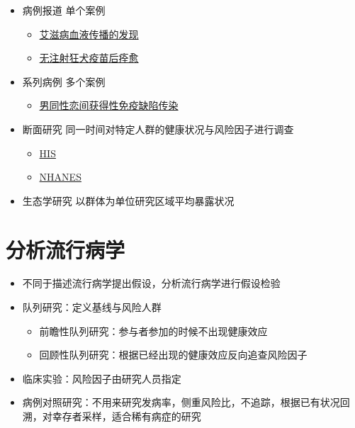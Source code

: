 \documentclass[]{book}
\providecommand{\tightlist}{%
  \setlength{\itemsep}{0pt}\setlength{\parskip}{0pt}}
\begin{document}
\begin{itemize}
\tightlist
\item
  病例报道 单个案例

  \begin{itemize}
  \tightlist
  \item
    \href{http://www.thelancet.com/journals/lancet/article/PIIS0140-6736(83)92082-2/abstract\#}{艾滋病血液传播的发现}
  \item
    \href{http://www.nejm.org/doi/full/10.1056/NEJMoa050382\#t=abstract}{无注射狂犬疫苗后痊愈}
  \end{itemize}
\item
  系列病例 多个案例

  \begin{itemize}
  \tightlist
  \item
    \href{http://www.nejm.org/doi/pdf/10.1056/NEJM198112103052401}{男同性恋间获得性免疫缺陷传染}
  \end{itemize}
\item
  断面研究 同一时间对特定人群的健康状况与风险因子进行调查

  \begin{itemize}
  \tightlist
  \item
    \href{http://www.cdc.gov/nchs/nhis.htm}{HIS}
  \item
    \href{http://www.cdc.gov/nchs/nhanes.htm}{NHANES}
  \end{itemize}
\item
  生态学研究 以群体为单位研究区域平均暴露状况
\end{itemize}

\hypertarget{ux5206ux6790ux6d41ux884cux75c5ux5b66}{%
\section{分析流行病学}\label{ux5206ux6790ux6d41ux884cux75c5ux5b66}}

\begin{itemize}
\tightlist
\item
  不同于描述流行病学提出假设，分析流行病学进行假设检验
\item
  队列研究：定义基线与风险人群

  \begin{itemize}
  \tightlist
  \item
    前瞻性队列研究：参与者参加的时候不出现健康效应
  \item
    回顾性队列研究：根据已经出现的健康效应反向追查风险因子
  \end{itemize}
\item
  临床实验：风险因子由研究人员指定
\item
  病例对照研究：不用来研究发病率，侧重风险比，不追踪，根据已有状况回溯，对幸存者采样，适合稀有病症的研究
\end{itemize}
\end{document}
